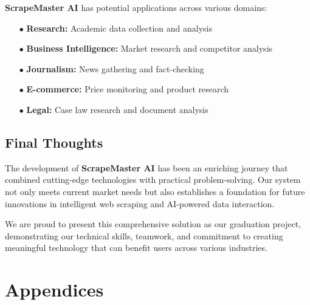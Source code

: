 \documentclass[12pt,a4paper]{report}
\begin{document}
\textbf{ScrapeMaster AI} has potential applications across various domains:

\begin{itemize}[leftmargin=2cm]
    \item[\textcolor{accentorange}{$\bullet$}] \textbf{Research:} Academic data collection and analysis
    \item[\textcolor{accentorange}{$\bullet$}] \textbf{Business Intelligence:} Market research and competitor analysis
    \item[\textcolor{accentorange}{$\bullet$}] \textbf{Journalism:} News gathering and fact-checking
    \item[\textcolor{accentorange}{$\bullet$}] \textbf{E-commerce:} Price monitoring and product research
    \item[\textcolor{accentorange}{$\bullet$}] \textbf{Legal:} Case law research and document analysis
\end{itemize}

\section{Final Thoughts}

The development of \textbf{ScrapeMaster AI} has been an enriching journey that combined cutting-edge technologies with practical problem-solving. Our system not only meets current market needs but also establishes a foundation for future innovations in intelligent web scraping and AI-powered data interaction.

We are proud to present this comprehensive solution as our graduation project, demonstrating our technical skills, teamwork, and commitment to creating meaningful technology that can benefit users across various industries.

\vspace{2cm}

\begin{center}
\end{center}

\chapter*{Appendices}
\end{document}
